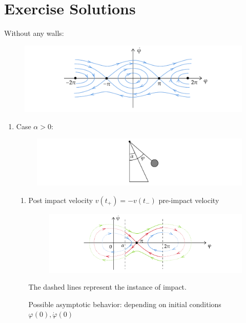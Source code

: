 \chapter{Exercise Solutions}
\begin{solution}[1.1]
Without any walls:
\begin{figure}[h]
	\centering
	\includegraphics[scale=0.9]{figures/solutions/ch1/S02D01.pdf}
\end{figure}

\begin{enumerate}
\item Case $\alpha > 0$:
\begin{figure}[h]
	\centering
	\includegraphics[scale=0.9]{figures/solutions/ch1/Q01D01.pdf}
\end{figure}

\newpage 
\begin{enumerate}
\item Post impact velocity $ v(t_+) = -v(t_-)$ pre-impact velocity

\begin{figure}[h]
	\centering
	\includegraphics[scale=0.9]{figures/solutions/ch1/S02D02.pdf}
\end{figure}
The dashed lines represent the instance of impact.

Possible asymptotic behavior: depending on initial conditions $\varphi(0), \dot{\varphi}(0)$ 


\end{enumerate}
\end{enumerate}
\end{solution}
